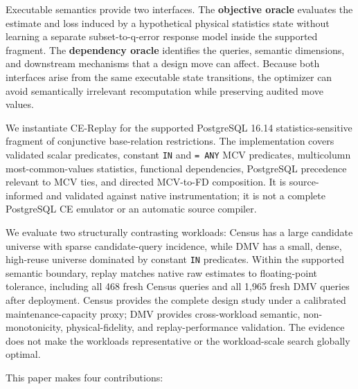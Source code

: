 \documentclass[sigconf,nonacm]{acmart}
\begin{document}
Executable semantics provide two interfaces. The \textbf{objective oracle} evaluates the estimate and loss induced by a hypothetical physical statistics state without learning a separate subset-to-q-error response model inside the supported fragment. The \textbf{dependency oracle} identifies the queries, semantic dimensions, and downstream mechanisms that a design move can affect. Because both interfaces arise from the same executable state transitions, the optimizer can avoid semantically irrelevant recomputation while preserving audited move values.

We instantiate CE-Replay for the supported PostgreSQL 16.14 statistics-sensitive fragment of conjunctive base-relation restrictions. The implementation covers validated scalar predicates, constant \texttt{IN} and \texttt{= ANY} MCV predicates, multicolumn most-common-values statistics, functional dependencies, PostgreSQL precedence relevant to MCV ties, and directed MCV-to-FD composition. It is source-informed and validated against native instrumentation; it is not a complete PostgreSQL CE emulator or an automatic source compiler.

We evaluate two structurally contrasting workloads: Census has a large candidate universe with sparse candidate-query incidence, while DMV has a small, dense, high-reuse universe dominated by constant \texttt{IN} predicates. Within the supported semantic boundary, replay matches native raw estimates to floating-point tolerance, including all 468 fresh Census queries and all 1,965 fresh DMV queries after deployment. Census provides the complete design study under a calibrated maintenance-capacity proxy; DMV provides cross-workload semantic, non-monotonicity, physical-fidelity, and replay-performance validation. The evidence does not make the workloads representative or the workload-scale search globally optimal.

This paper makes four contributions:
\end{document}
